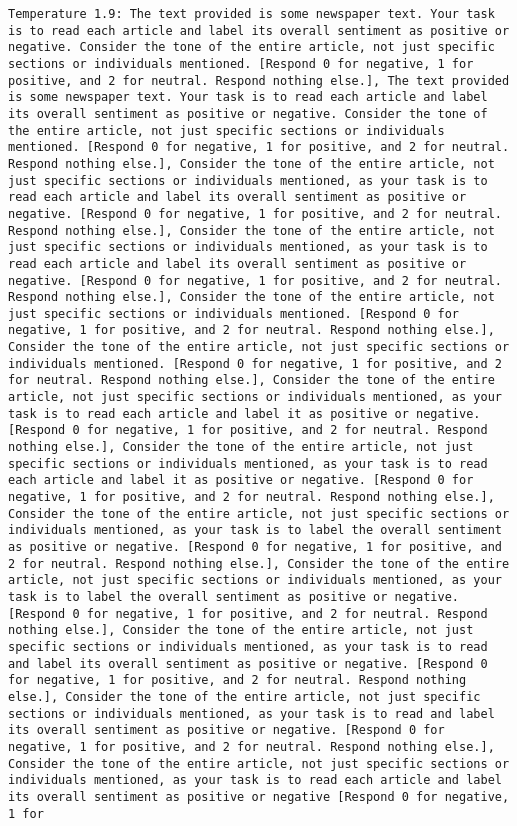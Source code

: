 \begin{lstlisting}[label=lst:poor_performing_prompts]
	Temperature 1.9: The text provided is some newspaper text. Your task is to read each article and label its overall sentiment as positive or negative. Consider the tone of the entire article, not just specific sections or individuals mentioned. [Respond 0 for negative, 1 for positive, and 2 for neutral. Respond nothing else.], The text provided is some newspaper text. Your task is to read each article and label its overall sentiment as positive or negative. Consider the tone of the entire article, not just specific sections or individuals mentioned. [Respond 0 for negative, 1 for positive, and 2 for neutral. Respond nothing else.], Consider the tone of the entire article, not just specific sections or individuals mentioned, as your task is to read each article and label its overall sentiment as positive or negative. [Respond 0 for negative, 1 for positive, and 2 for neutral. Respond nothing else.], Consider the tone of the entire article, not just specific sections or individuals mentioned, as your task is to read each article and label its overall sentiment as positive or negative. [Respond 0 for negative, 1 for positive, and 2 for neutral. Respond nothing else.], Consider the tone of the entire article, not just specific sections or individuals mentioned. [Respond 0 for negative, 1 for positive, and 2 for neutral. Respond nothing else.], Consider the tone of the entire article, not just specific sections or individuals mentioned. [Respond 0 for negative, 1 for positive, and 2 for neutral. Respond nothing else.], Consider the tone of the entire article, not just specific sections or individuals mentioned, as your task is to read each article and label it as positive or negative. [Respond 0 for negative, 1 for positive, and 2 for neutral. Respond nothing else.], Consider the tone of the entire article, not just specific sections or individuals mentioned, as your task is to read each article and label it as positive or negative. [Respond 0 for negative, 1 for positive, and 2 for neutral. Respond nothing else.], Consider the tone of the entire article, not just specific sections or individuals mentioned, as your task is to label the overall sentiment as positive or negative. [Respond 0 for negative, 1 for positive, and 2 for neutral. Respond nothing else.], Consider the tone of the entire article, not just specific sections or individuals mentioned, as your task is to label the overall sentiment as positive or negative. [Respond 0 for negative, 1 for positive, and 2 for neutral. Respond nothing else.], Consider the tone of the entire article, not just specific sections or individuals mentioned, as your task is to read and label its overall sentiment as positive or negative. [Respond 0 for negative, 1 for positive, and 2 for neutral. Respond nothing else.], Consider the tone of the entire article, not just specific sections or individuals mentioned, as your task is to read and label its overall sentiment as positive or negative. [Respond 0 for negative, 1 for positive, and 2 for neutral. Respond nothing else.], Consider the tone of the entire article, not just specific sections or individuals mentioned, as your task is to read each article and label its overall sentiment as positive or negative [Respond 0 for negative, 1 for 
\end{lstlisting}

